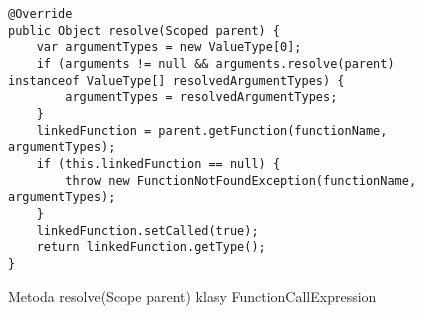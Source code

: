 \begin{figure}
\begin{lstlisting}
@Override
public Object resolve(Scoped parent) {
    var argumentTypes = new ValueType[0];
    if (arguments != null && arguments.resolve(parent) instanceof ValueType[] resolvedArgumentTypes) {
        argumentTypes = resolvedArgumentTypes;
    }
    linkedFunction = parent.getFunction(functionName, argumentTypes);
    if (this.linkedFunction == null) {
        throw new FunctionNotFoundException(functionName, argumentTypes);
    }
    linkedFunction.setCalled(true);
    return linkedFunction.getType();
}
\end{lstlisting}
\caption{Metoda resolve(Scope parent) klasy FunctionCallExpression} \label{lst:resolver-function-call}
\end{figure}


